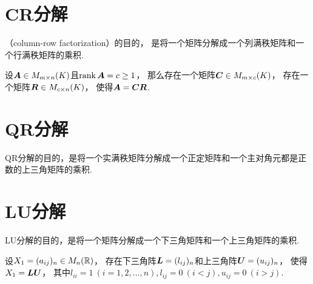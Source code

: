 \section{CR分解}
（column-row factorization）的目的，
是将一个矩阵分解成一个列满秩矩阵和一个行满秩矩阵的乘积.
\begin{theorem}
设\(\boldsymbol{A} \in M_{m \times n}(K)\)且\(\rank\boldsymbol{A} = c \geq 1\)，
那么存在一个矩阵\(\boldsymbol{C} \in M_{m \times c}(K)\)，
存在一个矩阵\(\boldsymbol{R} \in M_{c \times n}(K)\)，
使得\(\boldsymbol{A} = \boldsymbol{C} \boldsymbol{R}\).
\end{theorem}

\section{QR分解}
QR分解的目的，是将一个实满秩矩阵分解成一个正定矩阵和一个主对角元都是正数的上三角矩阵的乘积.

\section{LU分解}
LU分解的目的，是将一个矩阵分解成一个下三角矩阵和一个上三角矩阵的乘积.

\begingroup
\def\L{\vb{L}}%
\def\U{\vb{U}}%
\begin{theorem}
设\(X_1 = (a_{ij})_n \in M_n(\mathbb{R})\)，
存在下三角阵\(\L = (l_{ij})_n\)和上三角阵\(\U = (u_{ij})_n\)，
使得\(\A = \L \U\)，
其中\(l_{ii} = 1\ (i=1,2,\dotsc,n),
l_{ij} = 0\ (i<j),
u_{ij} = 0\ (i>j)\).
\end{theorem}

